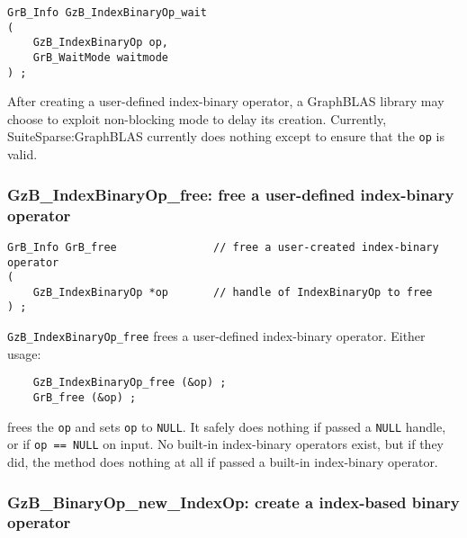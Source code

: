 \documentclass[12pt]{article}
\begin{document}
\begin{mdframed}[userdefinedwidth=6in]
{\footnotesize
\begin{verbatim}
GrB_Info GzB_IndexBinaryOp_wait
(
    GzB_IndexBinaryOp op,
    GrB_WaitMode waitmode
) ;
\end{verbatim}
}\end{mdframed}

After creating a user-defined index-binary operator, a GraphBLAS library may choose
to exploit non-blocking mode to delay its creation.  Currently,
SuiteSparse:GraphBLAS currently does nothing except to ensure that the
\verb'op' is valid.

\subsubsection{{\sf GzB\_IndexBinaryOp\_free:} free a user-defined index-binary operator}
\label{idxbinop_free}

\begin{mdframed}[userdefinedwidth=6in]
{\footnotesize
\begin{verbatim}
GrB_Info GrB_free               // free a user-created index-binary operator
(
    GzB_IndexBinaryOp *op       // handle of IndexBinaryOp to free
) ;
\end{verbatim}
}\end{mdframed}

\verb'GzB_IndexBinaryOp_free' frees a user-defined index-binary operator.  Either usage:

    {\small
    \begin{verbatim}
    GzB_IndexBinaryOp_free (&op) ;
    GrB_free (&op) ; \end{verbatim}}

\noindent
frees the \verb'op' and sets \verb'op' to \verb'NULL'.  It safely
does nothing if passed a \verb'NULL' handle, or if \verb'op == NULL' on
input.  No built-in index-binary operators exist, but if they did,
the method does nothing at all if passed a built-in index-binary operator.

\newpage
\subsubsection{{\sf GzB\_BinaryOp\_new\_IndexOp:} create a index-based binary operator}
\label{binop_new_idxop}
\end{document}
